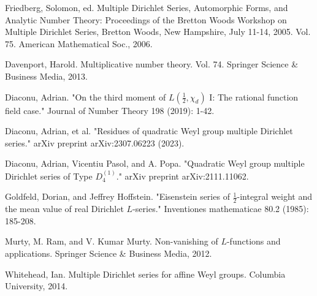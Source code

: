 \documentclass[12pt,reqno,oneside]{amsart}
\begin{document}
\begin{thebibliography}{}
  Friedberg, Solomon, ed. Multiple Dirichlet Series, Automorphic Forms, and Analytic Number Theory: Proceedings of the Bretton Woods Workshop on Multiple Dirichlet Series, Bretton Woods, New Hampshire, July 11-14, 2005. Vol. 75. American Mathematical Soc., 2006.

  Davenport, Harold. Multiplicative number theory. Vol. 74. Springer Science \& Business Media, 2013.

  Diaconu, Adrian. "On the third moment of $L(\frac{1}{2},\chi_{d})$ I: The rational function field case." Journal of Number Theory 198 (2019): 1-42.

  Diaconu, Adrian, et al. "Residues of quadratic Weyl group multiple Dirichlet series." arXiv preprint arXiv:2307.06223 (2023).

  Diaconu, Adrian, Vicentiu Pasol, and A. Popa. "Quadratic Weyl group multiple Dirichlet series of Type $D_{4}^{(1)}$." arXiv preprint arXiv:2111.11062.

  Goldfeld, Dorian, and Jeffrey Hoffstein. "Eisenstein series of $\frac{1}{2}$-integral weight and the mean value of real Dirichlet $L$-series." Inventiones mathematicae 80.2 (1985): 185-208.

  Murty, M. Ram, and V. Kumar Murty. Non-vanishing of $L$-functions and applications. Springer Science \& Business Media, 2012.

  Whitehead, Ian. Multiple Dirichlet series for affine Weyl groups. Columbia University, 2014.

\end{thebibliography}
\end{document}
